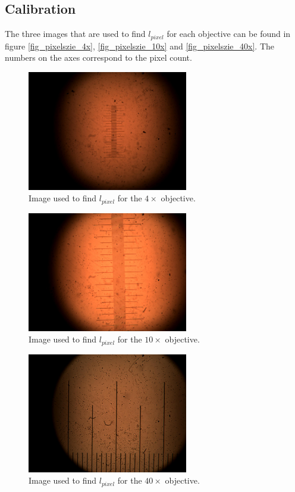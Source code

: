 \subsection{Calibration}
\label{appendix_calibration}

The three images that are used to find $l_{pixel}$ for each objective can be found in figure \ref{fig_pixelszie_4x}, \ref{fig_pixelszie_10x} and \ref{fig_pixelszie_40x}. The numbers on the axes correspond to the pixel count.

\begin{figure}[h!]
    \centering
    \includegraphics[width=7cm]{afbeeldingen/pixelsize/pixelsize_4x.jpg}
    \captionsetup{font=small, justification = centering}
    \caption{Image used to find $l_{pixel}$ for the $4\times$ objective.}
    \label{fig_pixelsize_4x}
\end{figure}

\begin{figure}[h!]
    \centering
    \includegraphics[width=7cm]{afbeeldingen/pixelsize/pixelsize_10x.jpg}
    \captionsetup{font=small, justification = centering}
    \caption{Image used to find $l_{pixel}$ for the $10\times$ objective.}
    \label{fig_pixelsize_10x}
\end{figure}

\begin{figure}[h!]
    \centering
    \includegraphics[width=7cm]{afbeeldingen/pixelsize/pixelsize_40x.jpg}
    \captionsetup{font=small, justification = centering}
    \caption{Image used to find $l_{pixel}$ for the $40\times$ objective.}
    \label{fig_pixelsize_40x}
\end{figure}